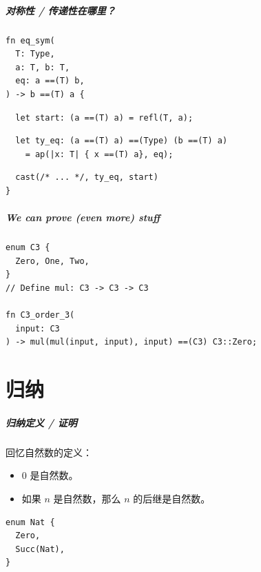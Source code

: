 \documentclass[UTF-8]{ctexbeamer}
\begin{document}
\begin{frame}[fragile]
  \frametitle{对称性 / 传递性在哪里？}

  \pause

  \begin{verbatim}
fn eq_sym(
  T: Type,
  a: T, b: T,
  eq: a ==(T) b,
) -> b ==(T) a {
  \end{verbatim}
  \pause
  \begin{verbatim}
  let start: (a ==(T) a) = refl(T, a);
  \end{verbatim}
  \pause
  \begin{verbatim}
  let ty_eq: (a ==(T) a) ==(Type) (b ==(T) a)
    = ap(|x: T| { x ==(T) a}, eq);
  \end{verbatim}
  \pause
  \begin{verbatim}
  cast(/* ... */, ty_eq, start)
}
  \end{verbatim}
\end{frame}

\begin{frame}[fragile]
  \frametitle{We can prove (even more) stuff}

  \begin{verbatim}
enum C3 {
  Zero, One, Two,
}
// Define mul: C3 -> C3 -> C3

fn C3_order_3(
  input: C3
) -> mul(mul(input, input), input) ==(C3) C3::Zero;
  \end{verbatim}
  

\end{frame}

\part{归纳}
\frame{\partpage}

\begin{frame}[fragile]
  \frametitle{归纳定义 / 证明}

  \pause

  回忆自然数的定义：
  \begin{itemize}
    \item 0 是自然数。
    \item 如果 $n$ 是自然数，那么 $n$ 的后继是自然数。
  \end{itemize}

  \pause

  \begin{verbatim}
enum Nat {
  Zero,
  Succ(Nat),
}
  \end{verbatim}
\end{frame}
\end{document}

